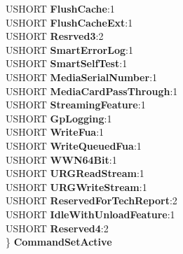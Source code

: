 \begin{DoxyCompactItemize}
\begin{tabbing}
\>USHORT {\bfseries FlushCache}:1\\
\>USHORT {\bfseries FlushCacheExt}:1\\
\>USHORT {\bfseries Resrved3}:2\\
\>USHORT {\bfseries SmartErrorLog}:1\\
\>USHORT {\bfseries SmartSelfTest}:1\\
\>USHORT {\bfseries MediaSerialNumber}:1\\
\>USHORT {\bfseries MediaCardPassThrough}:1\\
\>USHORT {\bfseries StreamingFeature}:1\\
\>USHORT {\bfseries GpLogging}:1\\
\>USHORT {\bfseries WriteFua}:1\\
\>USHORT {\bfseries WriteQueuedFua}:1\\
\>USHORT {\bfseries WWN64Bit}:1\\
\>USHORT {\bfseries URGReadStream}:1\\
\>USHORT {\bfseries URGWriteStream}:1\\
\>USHORT {\bfseries ReservedForTechReport}:2\\
\>USHORT {\bfseries IdleWithUnloadFeature}:1\\
\>USHORT {\bfseries Reserved4}:2\\
\} {\bfseries CommandSetActive}\\


\end{tabbing}
\end{DoxyCompactItemize}
